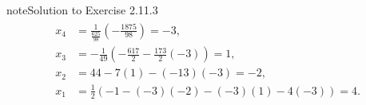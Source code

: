 \documentclass[letterpaper,10pt,english]{jupyterBook}
\begin{document}
\begin{sphinxadmonition}{note}{Solution to Exercise 2.11.3}
\begin{equation*}
\begin{split} \begin{align*} 
    x_{4} &=  \frac{1}{\frac{625}{98}} \left( - \frac{1875}{98} \right) = -3, \\ 
    x_{3} &=  - \frac{1}{49} \left( - \frac{617}{2} - \frac{173}{2} \left( -3 \right) \right) = 1, \\ 
    x_{2} &= 44 - 7 \left( 1 \right) - \left( -13 \right) \left( -3 \right) = -2, \\ 
    x_{1} &=  \frac{1}{2} \left( -1 - \left( -3 \right) \left( -2 \right) - \left( -3 \right) \left( 1 \right) - 4 \left( -3 \right) \right) = 4. 
\end{align*} \end{split}
\end{equation*}\end{sphinxadmonition}
 \label{_pages/A2_Linear_systems_exercises_solutions:_pages/A2_Linear_systems_exercises_solutions-solution-3}
\end{document}
